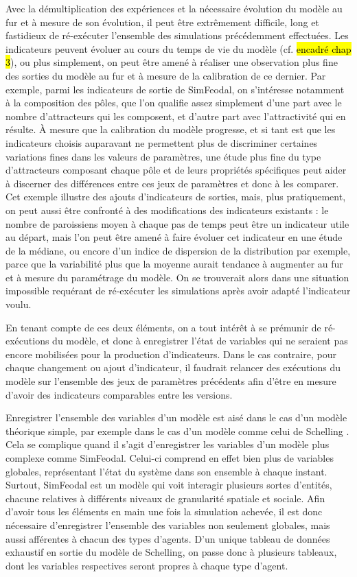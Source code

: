 	Avec la démultiplication des expériences et la nécessaire évolution du modèle au fur et à mesure de son évolution, il peut être extrêmement difficile, long et fastidieux de ré-exécuter l'ensemble des simulations précédemment effectuées.
	Les indicateurs peuvent évoluer au cours du temps de vie du modèle (cf. \hl{encadré chap 3}), ou plus simplement, on peut être amené à réaliser une observation plus fine des sorties du modèle au fur et à mesure de la calibration de ce dernier.
	Par exemple, parmi les indicateurs de sortie de SimFeodal, on s'intéresse notamment à la composition des pôles, que l'on qualifie assez simplement d'une part avec le nombre d'attracteurs qui les composent, et d'autre part avec l'attractivité qui en résulte.
	À mesure que la calibration du modèle progresse, et si tant est que les indicateurs choisis auparavant ne permettent plus de discriminer certaines variations fines dans les valeurs de paramètres, une étude plus fine du type d'attracteurs composant chaque pôle et de leurs propriétés spécifiques peut aider à discerner des différences entre ces jeux de paramètres et donc à les comparer.
	Cet exemple illustre des ajouts d'indicateurs de sorties, mais, plus pratiquement, on peut aussi être confronté à des modifications des indicateurs existants : le nombre de paroissiens moyen à chaque pas de temps peut être un indicateur utile au départ, mais l'on peut être amené à faire évoluer cet indicateur en une étude de la médiane, ou encore d'un indice de dispersion de la distribution par exemple, parce que la variabilité plus que la moyenne aurait tendance à augmenter au fur et à mesure du paramétrage du modèle.
	On se trouverait alors dans une situation impossible requérant de ré-exécuter les simulations après avoir adapté l'indicateur voulu.
	
	En tenant compte de ces deux éléments, on a tout intérêt à se prémunir de ré-exécutions du modèle, et donc à enregistrer l'état de variables qui ne seraient pas encore mobilisées pour la production d'indicateurs.	
	Dans le cas contraire, pour chaque changement ou ajout d'indicateur, il faudrait relancer des exécutions du modèle sur l'ensemble des jeux de paramètres précédents afin d'être en mesure d'avoir des indicateurs comparables entre les versions.

	Enregistrer l'ensemble des variables d'un modèle est aisé dans le cas d'un modèle théorique simple, par exemple dans le cas d'un modèle comme celui de Schelling \autocite{schelling_dynamic_1971}. Cela se complique quand il s'agit d'enregistrer les variables d'un modèle plus complexe comme SimFeodal.
	Celui-ci comprend en effet bien plus de variables globales, représentant l'état du système dans son ensemble à chaque instant.
	Surtout, SimFeodal est un modèle qui voit interagir plusieurs sortes d'entités, chacune relatives à différents niveaux de granularité spatiale et sociale.
	Afin d'avoir tous les éléments en main une fois la simulation achevée, il est donc nécessaire d'enregistrer l'ensemble des variables non seulement globales, mais aussi afférentes à chacun des types d'agents.
	D'un unique tableau de données exhaustif en sortie du modèle de Schelling, on passe donc à plusieurs tableaux, dont les variables respectives seront propres à chaque type d'agent.

